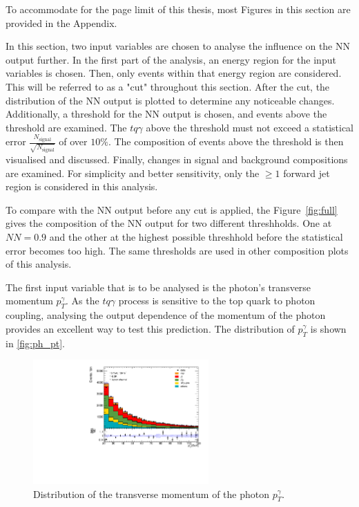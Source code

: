 To accommodate for the page limit of this thesis, most Figures in this section are provided in the Appendix.

In this section, two input variables are chosen to analyse the influence on the NN output further. In the first part of the analysis, an energy region for the input variables is chosen. Then, only events within that energy region are considered. This will be referred to as a "cut" throughout this section. 
After the cut, the distribution of the NN output is plotted to determine any noticeable changes. Additionally, a threshold for the NN output is chosen, and events above the threshold are examined. The $tq\gamma$ above the threshold must not exceed a statistical error $\frac{N_\text{signal}}{\sqrt{N_\text{signal}}}$ of over $10\%$. 
The composition of events above the threshold is then visualised and discussed. Finally, changes in signal and background compositions are examined. For simplicity and better sensitivity, only the $\geq 1$ forward jet region is considered in this analysis.

To compare with the NN output before any cut is applied, the Figure~\ref{fig:full} gives the composition of the NN output for two different threshholds. One at $NN = 0.9$ and the other at the highest possible threshhold before the statistical error becomes too high. The same thresholds are used in other composition plots of this analysis. 

The first input variable that is to be analysed is the photon's transverse momentum $p_T^\gamma$. As the $tq\gamma$ process is sensitive to the top quark to photon coupling, analysing the output dependence of the momentum of the photon provides an excellent way to test this prediction. 
The distribution of $p_T^\gamma$ is shown in \autoref{fig:ph_pt}. 

\begin{figure}
    \centering
    \includegraphics[width=0.6\textwidth]{Plots/ph_pt.pdf}
    \caption{Distribution of the transverse momentum of the photon $p_T^\gamma$.}
    \label{fig:ph_pt}
\end{figure}

